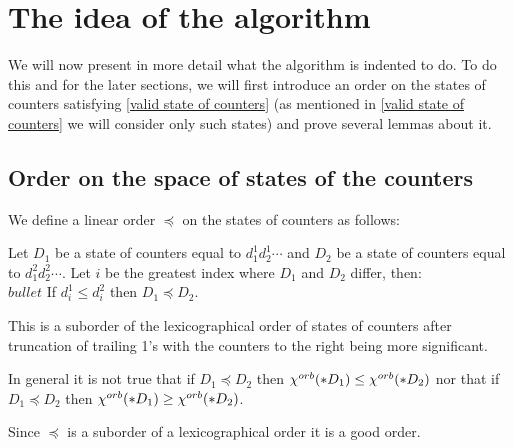 \section{The idea of the algorithm}\label{the idea of the algoritm}
We will now present in more detail what the algorithm is indented to do. 
To do this and for the later sections, we will first introduce an order on the states 
of counters satisfying \ref{valid state of counters} (as mentioned in 
\ref{valid state of counters} we will consider only such states) and prove several lemmas about it. 
\subsection{Order on the space of states of the counters}
\begin{definition}
We define a linear order $\preceq$ on the states of counters as follows:

Let $D_1$ be a state of counters equal to $d_1^1d_2^1\cdots$ and $D_2$ be a state of counters 
equal to $d_1^2d_2^2\cdots$. Let $i$ be the greatest index where $D_1$ and $D_2$ differ, then:\\
$bullet$ If $d_i^1 \leq d_i^2$ then $D_1 \preceq D_2$. 
\end{definition}

This is a suborder of the lexicographical order 
of states of counters after truncation of trailing 1's 
with the counters to the right being more significant. 

\begin{observation}
In general it is not true that if $D_1 \preceq D_2$ then 
${\chi^{orb}(*D_1)} \leq {\chi^{orb}(*D_2)}$ nor that if $D_1 \preceq D_2$ then 
${\chi^{orb}(*D_1)} \geq {\chi^{orb}(*D_2)}$.
\end{observation}

\begin{observation}\label{good lexicographical order}
Since $\preceq$ is a suborder of a lexicographical order it is a good order. 
\end{observation}

